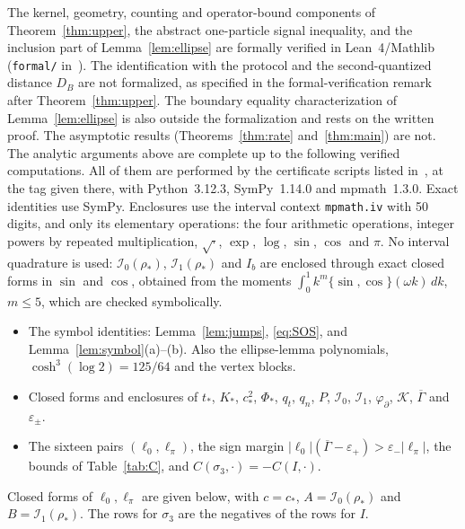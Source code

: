 \documentclass[11pt]{amsart}
\theoremstyle{definition}
\theoremstyle{remark}
\newcommand{\cK}{\mathcal{K}}
\begin{document}
The kernel, geometry, counting and operator-bound components of
Theorem~\ref{thm:upper}, the abstract one-particle signal inequality,
and the inclusion part of Lemma~\ref{lem:ellipse} are formally verified in Lean~4/Mathlib
(\texttt{formal/} in~\cite{Repo}).  The identification with the protocol
and the second-quantized distance $D_B$ are not formalized, as specified
in the formal-verification remark after Theorem~\ref{thm:upper}.  The
boundary equality characterization of Lemma~\ref{lem:ellipse} is also
outside the formalization and rests on the written proof. The
asymptotic results (Theorems~\ref{thm:rate} and~\ref{thm:main}) are not.
The analytic arguments above are complete up to the following verified
computations.  All of them are performed by the certificate scripts listed
in~\cite{Repo}, at the tag given there, with Python~3.12.3, SymPy~1.14.0
and mpmath~1.3.0.  Exact identities use SymPy.  Enclosures use the interval
context \texttt{mpmath.iv} with 50 digits, and only its elementary
operations: the four arithmetic operations, integer powers by repeated
multiplication, $\sqrt{\cdot}$, $\exp$, $\log$, $\sin$, $\cos$ and $\pi$.
No interval quadrature is used: $\mathcal I_0(\rho_*)$, $\mathcal I_1(\rho_*)$
and $I_b$ are enclosed through exact closed forms in $\sin$ and $\cos$,
obtained from the moments $\int_0^1k^m\{\sin,\cos\}(\omega k)\,dk$, $m\le5$,
which are checked symbolically.
\begin{itemize}
\item The symbol identities: Lemma~\ref{lem:jumps}, \eqref{eq:SOS}, and
  Lemma~\ref{lem:symbol}(a)--(b).  Also the ellipse-lemma polynomials,
  $\cosh^3(\log2)=125/64$ and the vertex blocks.
\item Closed forms and enclosures of $t_*$, $K_*$, $c_*^2$, $\Phi_*$,
  $q_t$, $q_n$, $P$, $\mathcal I_0$, $\mathcal I_1$, $\varphi_\partial$, $\cK$,
  $\overline\Gamma$ and $\varepsilon_\pm$.
\item The sixteen pairs $(\ell_0,\ell_\pi)$, the sign margin
  $|\ell_0|(\overline\Gamma-\varepsilon_+)>\varepsilon_-|\ell_\pi|$, the
  bounds of Table~\ref{tab:C}, and $C(\sigma_3,\cdot)=-C(I,\cdot)$.
\end{itemize}
Closed forms of $\ell_0,\ell_\pi$ are given below, with $c=c_*$,
$A=\mathcal I_0(\rho_*)$ and $B=\mathcal I_1(\rho_*)$.  The rows for
$\sigma_3$ are the negatives of the rows for $I$.
\end{document}
